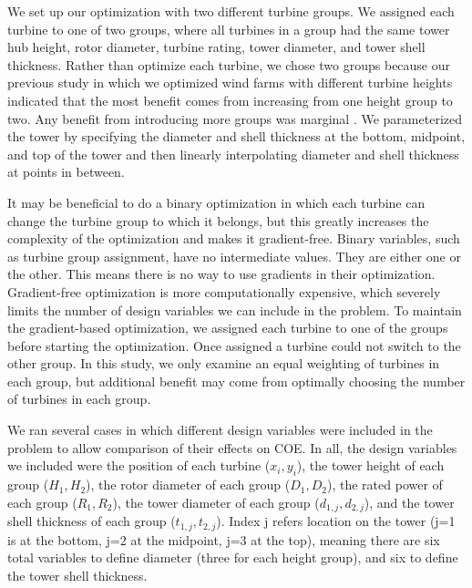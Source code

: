 We set up our optimization with two different turbine groups. We assigned each turbine to one of two groups, where all turbines in a group had the same tower hub height, rotor diameter, turbine rating, tower diameter, and tower shell thickness.
Rather than optimize each turbine, we chose two groups because our previous study in which we optimized wind farms with different turbine heights indicated that the most benefit comes from increasing from one height group to two. Any benefit from introducing more groups was marginal \citep{stanley2018}. We parameterized the tower by specifying the diameter and shell thickness at the bottom, midpoint, and top of the tower and then linearly interpolating diameter and shell thickness at points in between. 
        
        It may be beneficial to do a binary optimization in which each turbine can change the turbine group to which it belongs, but this greatly increases the complexity of the optimization and makes it gradient-free. Binary variables, such as turbine group assignment, have no intermediate values. They are either one or the other. This means there is no way to use gradients in their optimization. Gradient-free optimization is more computationally expensive, which severely limits the number of design variables we can include in the problem. To maintain the gradient-based optimization, we assigned each turbine to one of the groups before starting the optimization. Once assigned a turbine could not switch to the other group. In this study, we only examine an equal weighting of turbines in each group, but additional benefit may come from optimally choosing the number of turbines in each group.%
        
        We ran several cases in which different design variables were included in the problem to allow comparison of their effects on COE. In all, the design variables we included were the position of each turbine ($x_i,y_i$), the tower height of each group ($H_1, H_2$), the rotor diameter of each group ($D_1, D_2$), the rated power of each group ($R_1, R_2$), the tower diameter of each group ($d_{1,j}, d_{2,j}$), and the tower shell thickness of each group ($t_{1,j}, t_{2,j}$). Index j refers location on the tower (j=1 is at the bottom, j=2 at the midpoint, j=3 at the top), meaning there are six total variables to define diameter (three for each height group), and six to define the tower shell thickness.
                
